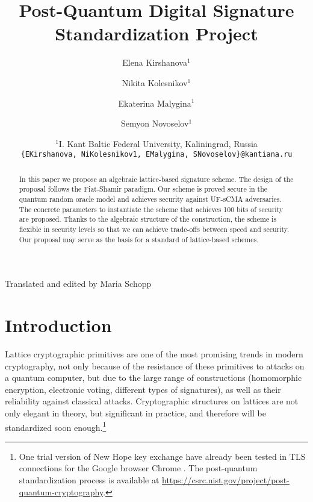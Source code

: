 \documentclass{article}
\title{Post-Quantum Digital Signature Standardization Project}
\author{Elena Kirshanova$^1$ \and Nikita Kolesnikov$^1$ \and Ekaterina Malygina$^1$ \and Semyon Novoselov$^1$}
\date{
    $^1$I. Kant Baltic Federal University, Kaliningrad, Russia \\ \texttt{\{EKirshanova, NiKolesnikov1, EMalygina, SNovoselov\}@kantiana.ru}\\%
}
\theoremstyle{plain}
\theoremstyle{definition}
\begin{document}
\maketitle
\begin{center}
Translated and edited by Maria Schopp
\end{center}

    \begin{abstract}
        
In this paper we propose an algebraic lattice-based signature scheme. The design of the proposal follows the Fiat-Shamir paradigm. Our scheme is proved secure in the quantum random oracle model and achieves security against UF-sCMA adversaries. The concrete parameters to instantiate the scheme that achieves 100 bits of security are proposed. Thanks to the algebraic structure of the construction, the scheme is flexible in security levels so that we can achieve trade-offs between speed and security. Our proposal may serve as the basis for a standard of lattice-based schemes.

    \end{abstract}

    
    \section{Introduction}
    \label{sec:intro}
    
    Lattice cryptographic primitives are one of the most promising trends in modern cryptography, not only because of the resistance of these primitives to attacks on a quantum computer, but due to the large range of constructions (homomorphic encryption, electronic voting, different types of signatures), as well as their reliability against classical attacks. Cryptographic structures on lattices are not only elegant in theory, but significant in practice, and therefore will be standardized soon enough.\footnote{One trial version of New Hope key exchange have already been tested in TLS connections for the Google browser Chrome \cite{ADPS16}. The post-quantum standardization process is available at \url{https://csrc.nist.gov/project/post-quantum-cryptography}.}
\end{document}
